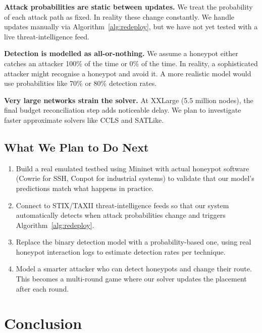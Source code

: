 \documentclass[journal]{IEEEtran}
\begin{document}
\textbf{Attack probabilities are static between updates.}
We treat the probability of each attack path as fixed. In reality
these change constantly. We handle updates manually via
Algorithm~\ref{alg:redeploy}, but we have not yet tested with
a live threat-intelligence feed.

\textbf{Detection is modelled as all-or-nothing.}
We assume a honeypot either catches an attacker 100\% of the
time or 0\% of the time. In reality, a sophisticated attacker
might recognise a honeypot and avoid it. A more realistic model
would use probabilities like 70\% or 80\% detection rates.

\textbf{Very large networks strain the solver.}
At XXLarge (5.5 million nodes), the final budget reconciliation
step adds noticeable delay. We plan to investigate faster
approximate solvers like CCLS and SATLike.

\subsection{What We Plan to Do Next}

\begin{enumerate}
  \item Build a real emulated testbed using Mininet with actual
        honeypot software (Cowrie for SSH, Conpot for industrial
        systems) to validate that our model's predictions match
        what happens in practice.
  \item Connect to STIX/TAXII threat-intelligence feeds so that
        our system automatically detects when attack probabilities
        change and triggers Algorithm~\ref{alg:redeploy}.
  \item Replace the binary detection model with a probability-based
        one, using real honeypot interaction logs to estimate
        detection rates per technique.
  \item Model a smarter attacker who can detect honeypots and
        change their route. This becomes a multi-round game where
        our solver updates the placement after each round.
\end{enumerate}

\section{Conclusion}
\label{sec:conclusion}
\end{document}
